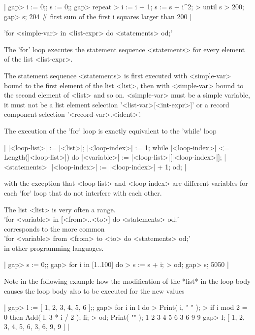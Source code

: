 |    gap> i := 0;;  s := 0;;
    gap> repeat
    >        i := i + 1;  s := s + i^2;
    >    until s > 200;
    gap> s;
    204        # first sum of the first i squares larger than 200 |

%

'for <simple-var>  in <list-expr>  do <statements>  od;'

The 'for' loop executes   the statement sequence <statements>  for  every
element of the list <list-expr>.

The statement sequence  <statements> is  first executed with <simple-var>
bound  to  the first element of  the list  <list>, then with <simple-var>
bound to the second element of <list> and  so on.  <simple-var> must be a
simple  variable,   it   must not     be   a list     element   selection
'<list-var>[<int-expr>]'     or       a    record    component  selection
'<record-var>.<ident>'.

The execution of the 'for' loop is exactly equivalent to the 'while' loop

|    |<loop-list>| := |<list>|;
    |<loop-index>| := 1;
    while |<loop-index>| <= Length(|<loop-list>|) do
        |<variable>| := |<loop-list>|[|<loop-index>|];
        |<statements>|
        |<loop-index>| := |<loop-index>| + 1;
    od; |

with the   exception   that  <loop-list> and <loop-index>  are  different
variables for each 'for' loop that do not interfere with each other.

The list <list> is very often a range.\\
'for <variable> in [<from>..<to>] do <statements> od;'\\
corresponds to the more common\\
'for <variable> from <from> to <to>  do <statements> od;'\\
in other programming languages.

|    gap> s := 0;;
    gap> for i  in [1..100]  do
    >        s := s + i;
    > od;
    gap> s;
    5050 |

Note in the following example  how the modification of  the *list* in the
loop body causes the loop body also to be executed for the new values

|    gap> l := [ 1, 2, 3, 4, 5, 6 ];;
    gap> for i  in l  do
    >        Print( i, " " );
    >        if i mod 2 = 0  then Add( l, 3 * i / 2 );  fi;
    > od;  Print( "\n" );
    1 2 3 4 5 6 3 6 9 9
    gap> l;
    [ 1, 2, 3, 4, 5, 6, 3, 6, 9, 9 ] |

